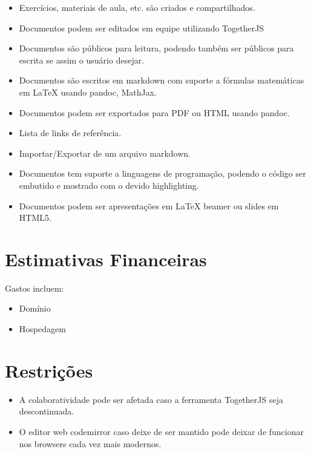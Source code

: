 \begin{itemize}
\item
  Exercícios, materiais de aula, etc. são criados e compartilhados.
\item
  Documentos podem ser editados em equipe utilizando TogetherJS
\item
  Documentos são públicos para leitura, podendo também ser públicos para
  escrita se assim o usuário desejar.
\item
  Documentos são escritos em markdown com suporte a fórmulas matemáticas
  em LaTeX usando pandoc, MathJax.
\item
  Documentos podem ser exportados para PDF ou HTML usando pandoc.
\item
  Lista de links de referência.
\item
  Importar/Exportar de um arquivo markdown.
\item
  Documentos tem suporte a linguagens de programação, podendo o código
  ser embutido e mostrado com o devido highlighting.
\item
  Documentos podem ser apresentações em LaTeX beamer ou slides em HTML5.
\end{itemize}
\section{Estimativas Financeiras}

Gastos incluem:

\begin{itemize}
\item
  Domínio
\item
  Hospedagem
\end{itemize}
\section{Restrições}

\begin{itemize}
\item
  A colaboratividade pode ser afetada caso a ferramenta TogetherJS seja
  descontinuada.
\item
  O editor web codemirror caso deixe de ser mantido pode deixar de
  funcionar nos browsers cada vez mais modernos.
\end{itemize}
